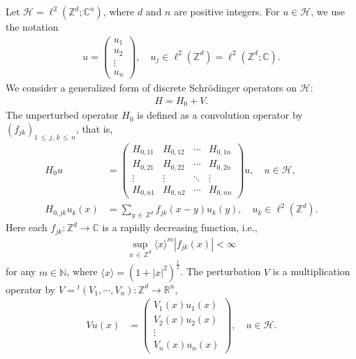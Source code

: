 \documentclass[10pt,a4paper]{amsart}
\newcommand{\Schr}{Schr\"odinger }
\newcommand{\C}{\mathbb{C}}
\newcommand{\R}{\mathbb{R}}
\newcommand{\Z}{\mathbb{Z}}
\newcommand{\bbN}{\mathbb{N}}
\newcommand{\HS}{\mathcal{H}}
\newcommand{\la}{\langle}
\newcommand{\ra}{\rangle}
\begin{document}
Let $\HS=\ell^2(\Z^d; \C^n)$, where $d$ and $n$ are positive integers. For $u \in \HS$, we use the notation
\begin{align*}
u=
\begin{pmatrix}
u_1 \\ u_2 \\ \vdots \\ u_n
\end{pmatrix}
, \quad u_j \in \ell^2\left(\Z^d\right)=\ell^2\left(\Z^d;\C\right).
\end{align*}
We consider a generalized form of discrete \Schr operators on $\HS$:
\begin{align*}
H=H_0+V.
\end{align*}
The unperturbed operator $H_0$ is defined as a convolution operator by $(f_{jk})_{1\,\leq\,j,\,k\,\leq\,n}$, that is,
\begin{align*}
H_0u &= 
\begin{pmatrix}
H_{0,11} & H_{0,12} & \cdots & H_{0,1n} \\
H_{0,21} & H_{0,22} & \cdots & H_{0,2n} \\
\vdots & \vdots & \ddots & \vdots \\
H_{0,n1} & H_{0,n2} & \cdots & H_{0,nn}
\end{pmatrix}
u, \quad u \in \HS, \\
H_{0,jk}u_k(x) &=\sum_{y\,\in\,\Z^d}f_{jk}(x-y)u_k(y), \quad u_k \in \ell^2\left(\Z^d\right).
\end{align*}
Here each $f_{jk}: \Z^d \rightarrow \C$ is a rapidly decreasing function, i.e.,
\begin{align*}
\sup_{x\,\in\,\Z^d} \la x \ra^m \left|f_{jk}(x)\right| <\infty
\end{align*}
for any $m\in\bbN$, where $\la x \ra = (1+|x|^2)^{\frac{1}{2}}$. The perturbation $V$ is a multiplication operator by $V={}^t(V_1,\cdots,V_n):\Z^d \to \R^n$,
\begin{align*}
Vu(x) &= 
\begin{pmatrix}
V_1(x) u_1(x) \\ V_2(x) u_2(x) \\ \vdots \\ V_n(x) u_n(x)
\end{pmatrix}
, \quad u \in \HS.
\end{align*}
\end{document}
